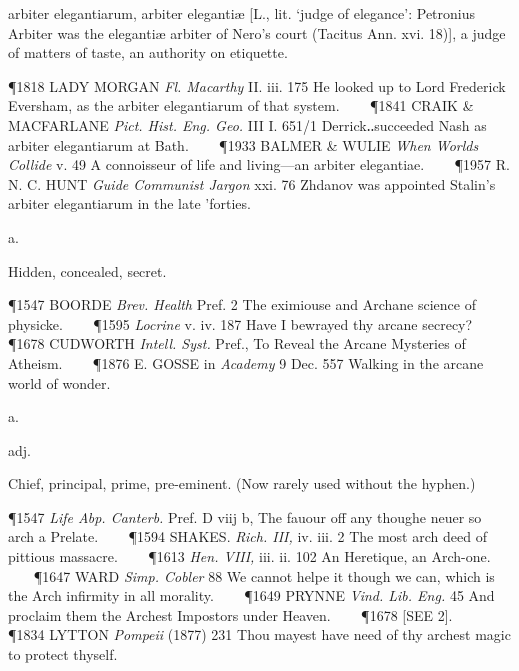 \begin{description}[wide, labelwidth=!, labelindent=0pt]
\begin{myenumerate}
 arbiter elegantiarum, arbiter elegantiæ [L., lit. ‘judge of elegance’: Petronius Arbiter was the elegantiæ arbiter of Nero's court (Tacitus Ann. xvi. 18)], a judge of matters of taste, an authority on etiquette.

\P 1818 LADY  MORGAN \textit{Fl. Macarthy} II. iii. 175 He looked up to Lord Frederick Eversham, as the arbiter elegantiarum of that system.    
\P 1841 CRAIK \& MACFARLANE  \textit{Pict. Hist. Eng. Geo.} III I. 651/1 Derrick‥succeeded Nash as arbiter elegantiarum at Bath.    
\P 1933 BALMER \& WULIE \textit{When Worlds Collide} v. 49 A connoisseur of life and living—an arbiter elegantiae.    
\P 1957 R. N. C. HUNT \textit{Guide Communist Jargon} xxi. 76 Zhdanov was appointed Stalin's arbiter elegantiarum in the late 'forties.
\end{myenumerate}


 a.

\noindent {}


\noindent
Hidden, concealed, secret.

\P 1547 BOORDE  \textit{Brev. Health} Pref. 2 The eximiouse and Archane science of physicke.    
\P 1595 \textit{Locrine}  v. iv. 187 Have I bewrayed thy arcane secrecy?    
\P 1678 CUDWORTH  \textit{Intell. Syst.} Pref., To Reveal the Arcane Mysteries of Atheism.    
\P 1876 E. GOSSE in \textit{Academy} 9 Dec. 557 Walking in the arcane world of wonder.


 a.

\noindent {}

\vspace{-0.3cm}

\begin{myenumerate}

 adj.

 Chief, principal, prime, pre-eminent. (Now rarely used without the hyphen.)

\P 1547 \textit{Life Abp. Canterb.} Pref. D viij b, The fauour off any thoughe neuer so arch a Prelate.    
\P 1594 SHAKES.  \textit{Rich. III,} iv. iii. 2 The most arch deed of pittious massacre.    
\P 1613 \textit{Hen. VIII,} iii. ii. 102 An Heretique, an Arch-one.    
\P 1647 WARD  \textit{Simp. Cobler} 88 We cannot helpe it though we can, which is the Arch infirmity in all morality.    
\P 1649 PRYNNE  \textit{Vind. Lib. Eng.} 45 And proclaim them the Archest Impostors under Heaven.    
\P 1678 [SEE 2].    
\P 1834 LYTTON  \textit{Pompeii} (1877) 231 Thou mayest have need of thy archest magic to protect thyself.


\end{myenumerate}
\end{description}
